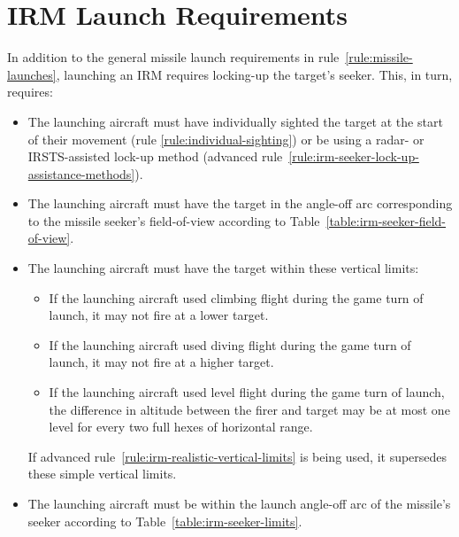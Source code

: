 {

}{

\section{IRM Launch Requirements}
\label{rule:irm-launch-requirements}
\label{rule:irm-launch-prerequisites}

In addition to the general missile launch requirements in rule~\ref{rule:missile-launches}, launching an IRM requires locking-up the target’s seeker. This, in turn, requires:

\begin{itemize}

    \item The launching aircraft must have individually sighted the target at the start of their movement (rule \ref{rule:individual-sighting}) or be using a radar- or IRSTS-assisted lock-up method (advanced rule~\ref{rule:irm-seeker-lock-up-assistance-methods}). 

    \item The launching aircraft must have the target in the angle-off arc corresponding to the missile seeker’s field-of-view according to Table~\ref{table:irm-seeker-field-of-view}.
 
    \item The launching aircraft must have the target within these vertical limits:
    \begin{itemize}

    \item If the launching aircraft used climbing flight during the game turn of launch, it may not fire at a lower target.

    \item If the launching aircraft used diving flight during the game turn of launch, it may not fire at a higher target.

    \item If the launching aircraft used level flight during the game turn of launch, the difference in altitude between the firer and target may be at most one level for every two full hexes of horizontal range.

    \end{itemize}
    If advanced rule~\ref{rule:irm-realistic-vertical-limits} is being used, it supersedes these simple vertical limits.
    
    \item The launching aircraft must be within the launch angle-off arc of the missile’s seeker according to Table~\ref{table:irm-seeker-limits}.
    

\end{itemize}}
